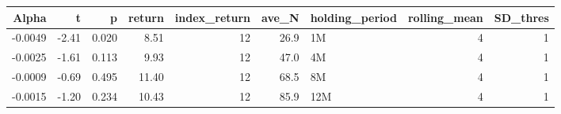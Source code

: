 \begin{table}[ht]
\centering
\begin{tabular}{rrrrrrlrr}
  \hline
Alpha & t & p & return & index\_return & ave\_N & holding\_period & rolling\_mean & SD\_thres \\ 
  \hline
-0.0049 & -2.41 & 0.020 & 8.51 & 12 & 26.9 & 1M &  4 &  1 \\ 
  -0.0025 & -1.61 & 0.113 & 9.93 & 12 & 47.0 & 4M &  4 &  1 \\ 
  -0.0009 & -0.69 & 0.495 & 11.40 & 12 & 68.5 & 8M &  4 &  1 \\ 
  -0.0015 & -1.20 & 0.234 & 10.43 & 12 & 85.9 & 12M &  4 &  1 \\ 
   \hline
\end{tabular}
\end{table}

